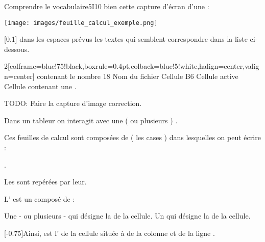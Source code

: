 \begin{EXO}{Comprendre le vocabulaire}{5I10}
 bien cette capture d'écran d'une  :
\vspace{-0.25cm}\begin{center}
    \texttt{[image: images/feuille\_calcul\_exemple.png]}
\end{center}
\vspace{-0.25cm}[0.1]  dans les espaces prévus les textes qui semblent correspondre dans la liste ci-dessous.

\begin{MultiColonnes}{2}[colframe=blue!75!black,boxrule=0.4pt,colback=blue!5!white,halign=center,valign=center]%
\tcbitem {} contenant le nombre 18
\tcbitem {}
\tcbitem Nom du fichier
\tcbitem {}
\tcbitem Cellule B6
\tcbitem Cellule active
\tcbitem[raster multicolumn=2] Cellule contenant une .
\end{MultiColonnes}

\exocorrection

TODO: Faire la capture d'image correction.

\end{EXO}
\newpage
\begin{Definition}
     Dans un tableur on interagit avec une ( ou plusieurs ) . 

    Ces feuilles de calcul sont composées de  ( les cases ) dans lesquelles on peut écrire :
    
    . 

    Les  sont repérées par leur. 
    
    L' est un  composé de :
            \begin{tcbenumerate}[2]
                \tcbitem Une - ou plusieurs -  qui désigne la  de la cellule.
                \tcbitem Un  qui désigne la  de la cellule.
            \end{tcbenumerate}
            
            [-0.75]Ainsi,  est l' de la cellule située à  de la colonne  et de la ligne .   
\end{Definition}
